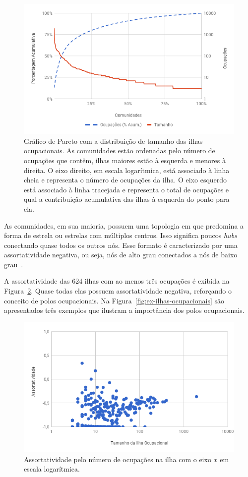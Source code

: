 \documentclass[12pt,a4paper]{article}
\begin{document}
\begin{figure}[htb]
    \centering
    \includegraphics[width=0.9\linewidth]{pareto-comunidades.png}
    \caption{Gráfico de Pareto com a distribuição de tamanho das ilhas ocupacionais. As comunidades estão ordenadas pelo número de ocupações que contêm, ilhas maiores estão à esquerda e menores à direita. O eixo direito, em escala logarítmica, está associado à linha cheia e representa o número de ocupações da ilha. O eixo esquerdo está associado à linha tracejada e representa o total de ocupações e qual a contribuição acumulativa das ilhas à esquerda do ponto para ela.}
    \label{fig:pareto-comunidades}
\end{figure}

As comunidades, em sua maioria, possuem uma topologia em que predomina a forma de estrela ou estrelas com múltiplos centros. Isso significa poucos \textit{hubs} conectando quase todos os outros nós. Esse formato é caracterizado por uma assortatividade negativa, ou seja, nós de alto grau conectados a nós de baixo grau~\cite{Barabasi2016-rn}.

A assortatividade das 624 ilhas com ao menos três ocupações é exibida na Figura~\ref{fig:assortatividade}. Quase todas elas possuem assortatividade negativa, reforçando o conceito de polos ocupacionais. Na Figura~\ref{fig:ex-ilhas-ocupacionais} são apresentados três exemplos que ilustram a importância dos polos ocupacionais.

\begin{figure}[htb]
    \centering
    \includegraphics[width=0.9\linewidth]{assortatividade.png}
    \caption{Assortatividade pelo número de ocupações na ilha com o eixo $x$ em escala logarítmica.}
    \label{fig:assortatividade}
\end{figure}
\end{document}
